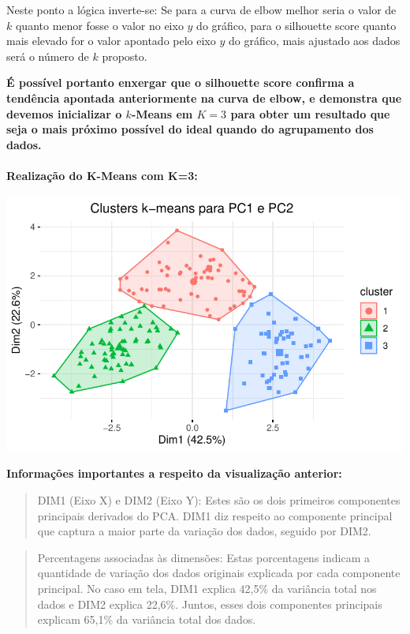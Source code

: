 \documentclass[
  letterpaper,
  DIV=11,
  numbers=noendperiod]{scrartcl}
\let\oldparagraph\paragraph
\renewcommand{\paragraph}[1]{\oldparagraph{#1}\mbox{}}
\begin{document}
Neste ponto a lógica inverte-se: Se para a curva de elbow melhor seria o
valor de \(k\) quanto menor fosse o valor no eixo \(y\) do gráfico, para
o silhouette score quanto mais elevado for o valor apontado pelo eixo
\(y\) do gráfico, mais ajustado aos dados será o número de \(k\)
proposto.

\textbf{É possível portanto enxergar que o silhouette score confirma a
tendência apontada anteriormente na curva de elbow, e demonstra que
devemos inicializar o \(k\)-Means em \(K=3\) para obter um resultado que
seja o mais próximo possível do ideal quando do agrupamento dos dados.}

\newpage{}

\paragraph{Realização do K-Means com
K=3:}\label{realizauxe7uxe3o-do-k-means-com-k3}

\includegraphics{wines_analysis_files/figure-pdf/unnamed-chunk-29-1.pdf}

\textbf{Informações importantes a respeito da visualização anterior:}

\begin{quote}
DIM1 (Eixo X) e DIM2 (Eixo Y): Estes são os dois primeiros componentes
principais derivados do PCA. DIM1 diz respeito ao componente principal
que captura a maior parte da variação dos dados, seguido por DIM2.
\end{quote}

\begin{quote}
Percentagens associadas às dimensões: Estas porcentagens indicam a
quantidade de variação dos dados originais explicada por cada componente
principal. No caso em tela, DIM1 explica 42,5\% da variância total nos
dados e DIM2 explica 22,6\%. Juntos, esses dois componentes principais
explicam 65,1\% da variância total dos dados.
\end{quote}
\end{document}
